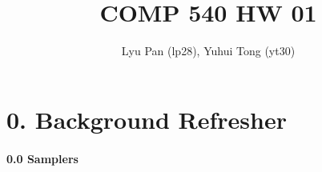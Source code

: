 \documentclass[english,11pt]{article}
\begin{document}
\title{COMP 540 HW 01 }

\author{Lyu Pan (lp28), Yuhui Tong (yt30)}
\maketitle




\part*{0. Background Refresher}

\subsection*{0.0 Samplers} 
\end{document}
